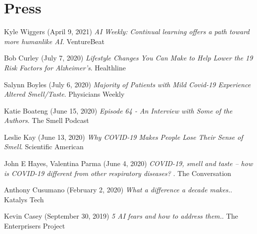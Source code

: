 \documentclass[10pt]{cooperCV2}
\begin{document}
%	










\section{Press}

 
\begin{etaremune}[itemindent=-1.5\bibhang, topsep=0pt,
				   itemsep=\bibsep,partopsep=0pt,parsep=0pt,leftmargin={\bibhang+\widthof{[999]}}] 
    
    
    \item Kyle Wiggers (April 9, 2021) \textit{AI Weekly: Continual learning offers a path toward more humanlike AI}. VentureBeat
     
	
    \item Bob Curley (July 7, 2020) \textit{Lifestyle Changes You Can Make to Help Lower the 19 Risk Factors for Alzheimer’s}. Healthline
     
	
    \item Salynn Boyles (July 6, 2020) \textit{Majority of Patients with Mild Covid-19 Experience Altered Smell/Taste}. Physicians Weekly
     
	
    \item Katie Boateng (June 15, 2020) \textit{Episode 64 - An Interview with Some of the Authors}. The Smell Podcast
     
	
    \item Leslie Kay (June 13, 2020) \textit{Why COVID-19 Makes People Lose Their Sense of Smell}. Scientific American
     
	
    \item John E Hayes, Valentina Parma (June 4, 2020) \textit{COVID-19, smell and taste – how is COVID-19 different from other respiratory diseases? }. The Conversation
     
	
    \item Anthony Cusumano (February 2, 2020) \textit{What a difference a decade makes.}. Katalys Tech
     
	
    \item Kevin Casey (September 30, 2019) \textit{5 AI fears and how to address them.}. The Enterprisers Project
     

\end{etaremune}
\end{document}

